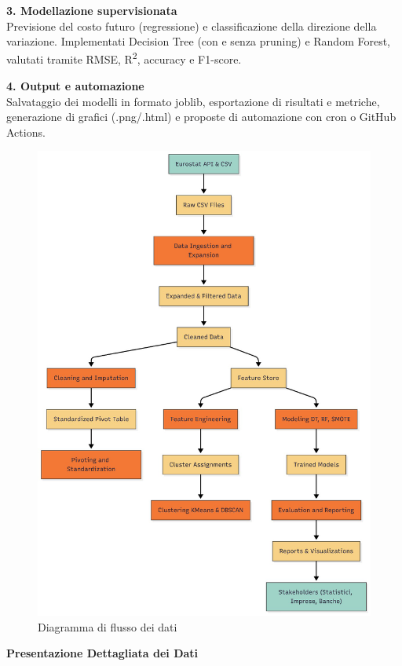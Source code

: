 \documentclass[conference]{IEEEtran}
\begin{document}
\vspace{1em}

{\large \textbf{3. Modellazione supervisionata}}\\
{\small Previsione del costo futuro (regressione) e classificazione della direzione della variazione. Implementati Decision Tree (con e senza pruning) e Random Forest, valutati tramite RMSE, R\textsuperscript{2}, accuracy e F1-score.}

\vspace{1em}

{\large \textbf{4. Output e automazione}}\\
{\small Salvataggio dei modelli in formato joblib, esportazione di risultati e metriche, generazione di grafici (.png/.html) e proposte di automazione con cron o GitHub Actions.}

\begin{figure}[h]
  \centering
  \includegraphics[width=0.8\linewidth]{Data_Flow_Diagram.png}  
  \caption{Diagramma di flusso dei dati}
  \label{fig:dataflow}
\end{figure}

\vspace{1em}
{\Large\bfseries Presentazione Dettagliata dei Dati}
\vspace{0.5em}
     
\end{document}
